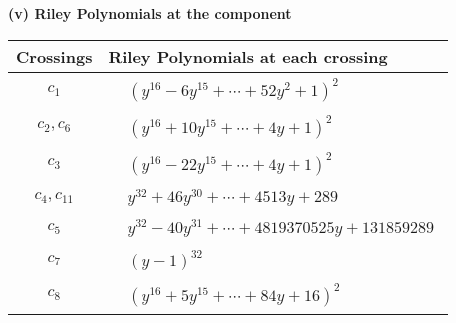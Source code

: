\documentclass[1p]{elsarticle_modified}
\theoremstyle{definition}
\begin{document}
\newpage\renewcommand{\arraystretch}{1}
\flushleft \textbf{(v) Riley Polynomials at the component}\newline \\
\begin{tabular}{m{50pt}|m{274pt}}
Crossings & \hspace{64pt}Riley Polynomials at each crossing \\
\hline $$\begin{aligned}c_{1}\end{aligned}$$&$\begin{aligned}
&(y^{16}-6 y^{15}+\cdots+52 y^2+1)^{2}
\end{aligned}$\\
\hline $$\begin{aligned}c_{2},c_{6}\end{aligned}$$&$\begin{aligned}
&(y^{16}+10 y^{15}+\cdots+4 y+1)^{2}
\end{aligned}$\\
\hline $$\begin{aligned}c_{3}\end{aligned}$$&$\begin{aligned}
&(y^{16}-22 y^{15}+\cdots+4 y+1)^{2}
\end{aligned}$\\
\hline $$\begin{aligned}c_{4},c_{11}\end{aligned}$$&$\begin{aligned}
&y^{32}+46 y^{30}+\cdots+4513 y+289
\end{aligned}$\\
\hline $$\begin{aligned}c_{5}\end{aligned}$$&$\begin{aligned}
&y^{32}-40 y^{31}+\cdots+4819370525 y+131859289
\end{aligned}$\\
\hline $$\begin{aligned}c_{7}\end{aligned}$$&$\begin{aligned}
&(y-1)^{32}
\end{aligned}$\\
\hline $$\begin{aligned}c_{8}\end{aligned}$$&$\begin{aligned}
&(y^{16}+5 y^{15}+\cdots+84 y+16)^{2}
\end{aligned}$\\

\end{tabular}
\end{document}
